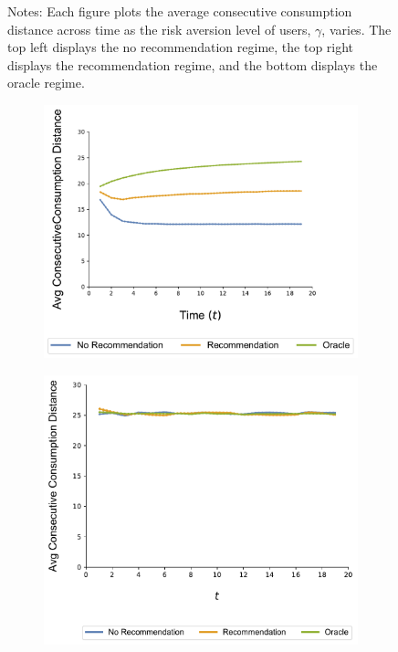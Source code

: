 \documentclass[format=acmsmall, review=true]{acmart}
\begin{document}
\begin{figure}[H]
\begin{subfigure}{.45\textwidth}
\end{subfigure}%
\caption*{\scriptsize Notes: Each figure plots the average consecutive consumption distance across time as the risk aversion level of users, $\gamma$, varies. The top left displays the no recommendation regime, the top right displays the recommendation regime, and the bottom displays the oracle regime.}
\label{fig:no_rec_risk_aversion}
\end{figure}
\addtocounter{figure}{-1}

\begin{figure}[H]
\caption{Local Consumption and Correlation, $N = 100$}
\begin{subfigure}{.5\linewidth}
  \centering
  \includegraphics[width=.9\linewidth]{figures/rho_pos_consumption_dist_N_100T_20_overall.pdf}
  \label{fig:sfig1}
\end{subfigure}%
\begin{subfigure}{.5\linewidth}
  \centering
  \includegraphics[width=.9\linewidth]{figures/rho_zero_consumption_dist_N_100T_20_overall.pdf}

\end{subfigure}
\end{figure}
\end{document}
